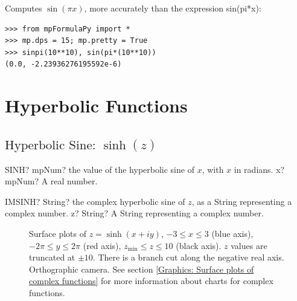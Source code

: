 Computes $\sin(\pi x)$, more accurately than the expression sin(pi*x):

\begin{lstlisting}
>>> from mpFormulaPy import *
>>> mp.dps = 15; mp.pretty = True
>>> sinpi(10**10), sin(pi*(10**10))
(0.0, -2.23936276195592e-6)
\end{lstlisting}








\newpage
\section{Hyperbolic Functions}
\label{HyperbolicFunctionsCplx}

\subsection{\texorpdfstring{$\text{Hyperbolic Sine: }\sinh(z)$}{sinh}}

\begin{mpFunctionsExtract}
	\mpWorksheetFunctionOneNotImplemented
	{SINH? mpNum? the value of the hyperbolic sine of $x$, with $x$ in radians.}
	{x? mpNum? A real number.}
\end{mpFunctionsExtract}

\vspace{0.6cm}
\begin{mpFunctionsExtract}
	\mpWorksheetFunctionOneNotImplemented
	{IMSINH? String? the complex hyperbolic sine of $z$, as a String representing a complex number.}
	{z? String? A String representing a complex number.}
\end{mpFunctionsExtract}


\begin{figure}[ht]%
	\centering
	\qquad
	\caption[Complex Hyperbolic Sine]{Surface plots of $z = \sinh(x + iy)$, $-3 \leq x \leq 3$ (blue axis), $-2 \pi \leq y \leq 2\pi$ (red axis), $z_{\text{min}} \leq z \leq 10$ (black axis). $z$ values are truncated at $\pm 10$. There is a branch cut along the negative real axis. Orthographic camera. See section \ref{Graphics: Surface plots of complex functions} for more information about charts for complex functions.} 
	\label{fig:Complex Hyperbolic Sine}%
\end{figure}


